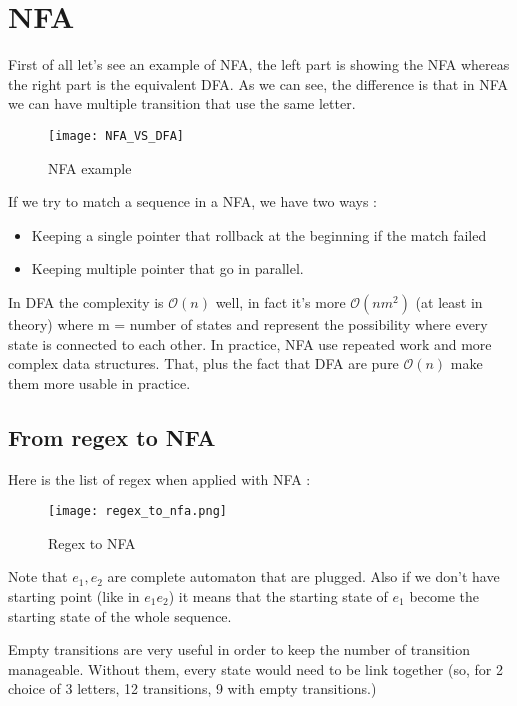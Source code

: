 \section{NFA}
    First of all let's see an example of NFA, the left part is showing the NFA
    whereas the right part is the equivalent DFA. As we can see, the difference
    is that in NFA we can have multiple transition that use the same letter. 
    \begin{figure}[H]
         \centering
         \texttt{[image: NFA\_VS\_DFA]}
         \caption{NFA example}
         \label{fig:nfa_ex}
    \end{figure}
    If we try to match a sequence in a NFA, we have two ways : 
    \begin{itemize}
        \item Keeping a single pointer that rollback at the beginning if the
        match failed
        \item Keeping multiple pointer that go in parallel.
    \end{itemize}

    In DFA the complexity is $\mathcal{O}(n)$ well, in fact it's more
    $\mathcal{O}(nm^2)$ (at least in theory) where m = number of states and
    represent the possibility where every state is connected to each other. In
    practice, NFA use repeated work and more complex data structures. That, plus
    the fact that DFA are pure $\mathcal{O}(n)$ make them more usable in
    practice.

    \subsection{From regex to NFA}
        Here is the list of regex when applied with NFA : 
        \begin{figure}[H]
             \centering
             \texttt{[image: regex\_to\_nfa.png]}
             \caption{Regex to NFA}
             \label{fig:regex_nfa}
        \end{figure}
        Note that $e_1, e_2$ are complete automaton that are plugged. Also if we
        don't have starting point (like in $e_1 e_2$) it means that the starting
        state of $e_1$ become the starting state of the whole sequence.

        Empty transitions are very useful in order to keep the number of
        transition manageable. Without them, every state would need to be link
        together (so, for 2 choice of 3 letters, 12 transitions, 9 with empty
        transitions.)

